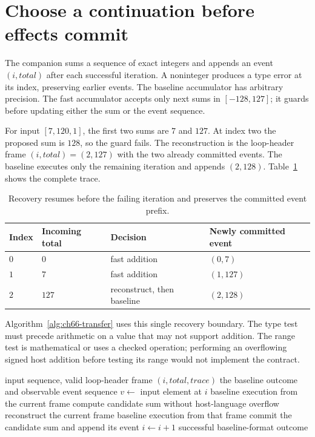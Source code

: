 \section{Choose a continuation before effects commit}
\label{sec:ch66-loop}

The companion sums a sequence of exact integers and appends an event $(i,total)$ after each successful iteration.
A noninteger produces a type error at its index, preserving earlier events.
The baseline accumulator has arbitrary precision.
The fast accumulator accepts only next sums in $[-128,127]$; it guards before updating either the sum or the event sequence.

For input $[7,120,1]$, the first two sums are $7$ and $127$.
At index two the proposed sum is $128$, so the guard fails.
The reconstruction is the loop-header frame $(i,total)=(2,127)$ with the two already committed events.
The baseline executes only the remaining iteration and appends $(2,128)$.
Table~\ref{tab:ch66-trace} shows the complete trace.

\begin{table}[htbp]
\caption{Recovery resumes before the failing iteration and preserves the committed event prefix.}
\label{tab:ch66-trace}
\centering
\begin{tabular}{llll}
\toprule
Index & Incoming total & Decision & Newly committed event \\
\midrule
$0$ & $0$ & fast addition & $(0,7)$ \\
$1$ & $7$ & fast addition & $(1,127)$ \\
$2$ & $127$ & reconstruct, then baseline & $(2,128)$ \\
\bottomrule
\end{tabular}
\end{table}

Algorithm~\ref{alg:ch66-transfer} uses this single recovery boundary.
The type test must precede arithmetic on a value that may not support addition.
The range test is mathematical or uses a checked operation; performing an overflowing signed host addition before testing its range would not implement the contract.

\begin{algorithm}[htbp]
\caption{Run a narrow speculative loop with loop-header recovery.}
\label{alg:ch66-transfer}
\begin{pseudocode}
\Require input sequence, valid loop-header frame $(i,total,trace)$
\Ensure the baseline outcome and observable event sequence
  \State $v\gets$ input element at $i$
    \State \Return baseline execution from the current frame
  \EndIf
  \State compute candidate sum without host-language overflow
    \State reconstruct the current frame
    \State \Return baseline execution from that frame
  \EndIf
  \State commit the candidate sum and append its event
  \State $i\gets i+1$
\EndWhile
\State \Return successful baseline-format outcome
\end{pseudocode}
\end{algorithm}

